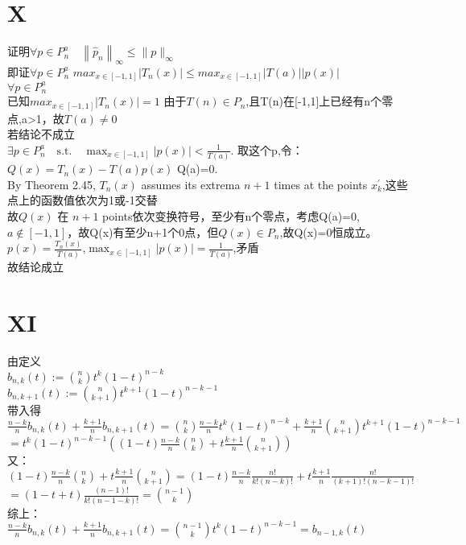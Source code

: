 \documentclass[a4paper]{article}
\begin{document}
\section*{X}
证明$\forall p \in P_n^a \quad \left\| \hat{p}_n \right\|_{\infty} \leq \| p \|_{\infty}$\\
即证$\forall p \in P_n^a$ $max_{x\in[-1,1]}|T_n(x)| \leq max_{x\in[-1,1]}|T(a)||p(x)|$\\
$\forall p \in P_n^a$\\
已知$max_{x\in[-1,1]}|T_n(x)|=1$
由于$T(n)\in P_n$,且T(n)在[-1,1]上已经有n个零点,a>1，故$T(a)\neq 0$\\
若结论不成立\\
$\exists p \in P_n^a \quad \text{s.t.} \quad \max_{x \in [-1,1]} \left| p(x) \right| < \frac{1}{T(a)}. $
取这个p,令：\\
$Q(x) = T_n(x) - T(a) p(x)$ Q(a)=0.\\
By Theorem 2.45, $T_{n}(x)$ assumes its extrema $n+1$ times at the points $x_{k}^{\prime}$,这些点上的函数值依次为1或-1交替\\
故$Q(x)$ 在 $n+1$ points依次变换符号，至少有n个零点，考虑Q(a)=0,$a\notin [-1,1]$，故Q(x)有至少n+1个0点，但$Q(x)\in P_n$,故Q(x)=0恒成立。\\
$p(x)=\frac{T_n(x)}{T(a)}$,$\max_{x \in [-1,1]} \left| p(x) \right|=\frac{1}{T(a)}$,矛盾\\
故结论成立\\




\section*{XI}
由定义\\
$b_{n,k}(t) := \binom{n}{k} t^k (1-t)^{n-k} $\\
$b_{n,k+1}(t) := \binom{n}{k+1} t^{k+1} (1-t)^{n-k-1} $\\
带入得\\
$\frac{n-k}{n}b_{n,k}(t)+\frac{k+1}{n}b_{n,k+1}(t)=\binom{n}{k}\frac{n-k}{n} t^k (1-t)^{n-k}+\frac{k+1}{n}\binom{n}{k+1} t^{k+1} (1-t)^{n-k-1}$\\
$=t^k(1-t)^{n-k-1}((1-t)\frac{n-k}{n}\binom{n}{k}+t\frac{k+1}{n}\binom{n}{k+1})$\\
又：
$(1-t)\frac{n-k}{n}\binom{n}{k}+t\frac{k+1}{n}\binom{n}{k+1}=(1-t)\frac{n-k}{n}\frac{n!}{k!(n-k)!}+t\frac{k+1}{n}\frac{n!}{(k+1)!(n-k-1)!}$
$=(1-t+t)\frac{(n-1)!}{k!(n-1-k)!}=\binom{n-1}{k}$\\
综上：\\
$\frac{n-k}{n}b_{n,k}(t)+\frac{k+1}{n}b_{n,k+1}(t)=\binom{n-1}{k}t^k(1-t)^{n-k-1}=b_{n-1,k}(t)$\\
\end{document}
